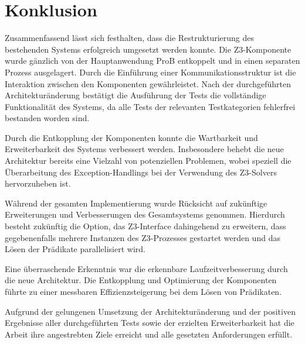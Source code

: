 

\section{Konklusion}

Zusammenfassend lässt sich festhalten, dass die Restrukturierung des bestehenden Systems erfolgreich umgesetzt werden konnte.
Die Z3-Komponente wurde gänzlich von der Hauptanwendung ProB entkoppelt und in einen separaten Prozess ausgelagert.
Durch die Einführung einer Kommunikationsstruktur ist die Interaktion zwischen den Komponenten gewährleistet.
Nach der durchgeführten Architekturänderung bestätigt die Ausführung der Tests die vollständige Funktionalität des Systems,
da alle Tests der relevanten Testkategorien fehlerfrei bestanden worden sind.

Durch die Entkopplung der Komponenten konnte die Wartbarkeit und Erweiterbarkeit des Systems verbessert werden.
Insbesondere behebt die neue Architektur bereits eine Vielzahl von potenziellen Problemen,
wobei speziell die Überarbeitung des Exception-Handlings bei der Verwendung des Z3-Solvers hervorzuheben ist.

Während der gesamten Implementierung wurde Rücksicht auf zukünftige Erweiterungen und Verbesserungen des Gesamtsystems genommen.
Hierdurch besteht zukünftig die Option,
das Z3-Interface dahingehend zu erweitern,
dass gegebenenfalls mehrere Instanzen des Z3-Prozesses gestartet werden und das Lösen der Prädikate parallelisiert wird.

Eine überraschende Erkenntnis war die erkennbare Laufzeitverbesserung durch die neue Architektur.
Die Entkopplung und Optimierung der Komponenten führte
zu einer messbaren Effizienzsteigerung bei dem Lösen von Prädikaten.

Aufgrund der gelungenen Umsetzung der Architekturänderung und der positiven Ergebnisse aller durchgeführten Tests
sowie der erzielten Erweiterbarkeit hat die Arbeit ihre angestrebten Ziele erreicht und alle gesetzten Anforderungen erfüllt.
